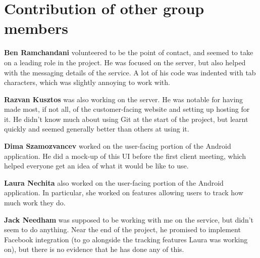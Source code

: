 \documentclass{article}
\begin{document}
\section{Contribution of other group members}
\textbf{Ben Ramchandani} volunteered to be the point of contact, and seemed to take on a leading role in the project. He was focused on the server, but also helped with the messaging details of the service. A lot of his code was indented with tab characters, which was slightly annoying to work with.

\textbf{Razvan Kusztos} was also working on the server. He was notable for having made most, if not all, of the customer-facing website and setting up hosting for it. He didn't know much about using Git at the start of the project, but learnt quickly and seemed generally better than others at using it.

\textbf{Dima Szamozvancev} worked on the user-facing portion of the Android application. He did a mock-up of this UI before the first client meeting, which helped everyone get an idea of what it would be like to use.

\textbf{Laura Nechita} also worked on the user-facing portion of the Android application. In particular, she worked on features allowing users to track how much work they do.

\textbf{Jack Needham} was supposed to be working with me on the service, but didn't seem to do anything. Near the end of the project, he promised to implement Facebook integration (to go alongside the tracking features Laura was working on), but there is no evidence that he has done any of this.
\end{document}
